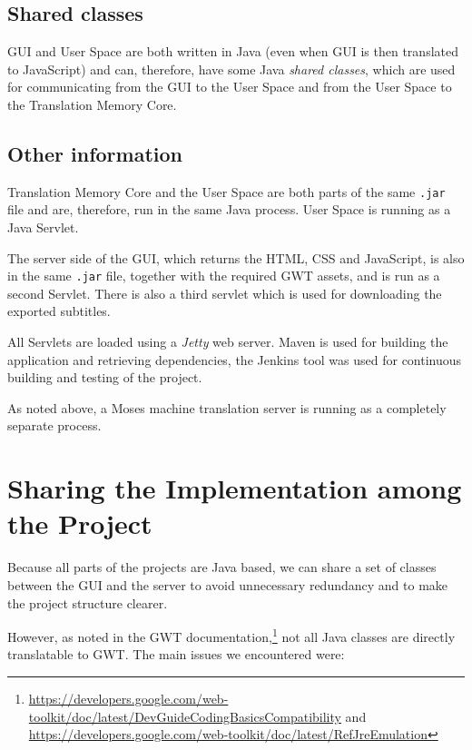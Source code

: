 \subsection*{Shared classes}

GUI and User Space are both written in Java (even when GUI is then translated to JavaScript) and can, therefore, have some Java \emph{shared classes}, which are used for communicating from the GUI to the User Space and from the User Space to the Translation Memory Core.


\subsection*{Other information}

Translation Memory Core and the User Space are both parts of the same \texttt{.jar} file and are, therefore, run in the same Java process. User Space is running as a Java Servlet.

The server side of the GUI, which returns the HTML, CSS and JavaScript, is also in the same \texttt{.jar} file, together with the required GWT assets, and is run as a second Servlet. There is also a third servlet which is used for downloading the exported subtitles.

All Servlets are loaded using a \emph{Jetty} web server. Maven is used for building the application and retrieving dependencies, the Jenkins tool was used for continuous building and testing of the project.

As noted above, a Moses machine translation server is running as a completely separate process.


\section{Sharing the Implementation among the Project}

Because all parts of the projects are Java based, we can share a set of classes between the GUI and the server to avoid unnecessary redundancy and to make the project structure clearer.

However, as noted in the GWT documentation,\footnote{\url{https://developers.google.com/web-toolkit/doc/latest/DevGuideCodingBasicsCompatibility} and \url{https://developers.google.com/web-toolkit/doc/latest/RefJreEmulation}} not all Java classes are directly translatable to GWT. The main issues we encountered were:

